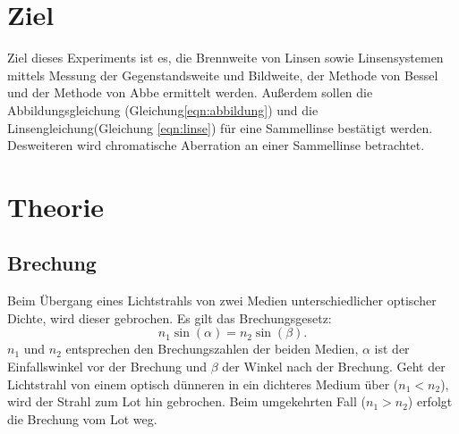 \section{Ziel}
\label{sec:Ziel}
Ziel dieses Experiments ist es, die Brennweite von Linsen sowie Linsensystemen mittels Messung der Gegenstandsweite und Bildweite, der Methode von Bessel und der Methode von Abbe ermittelt werden. Außerdem sollen die Abbildungsgleichung (Gleichung\ref{eqn:abbildung}) und die Linsengleichung(Gleichung \ref{eqn:linse})  für eine Sammellinse bestätigt werden. Desweiteren wird chromatische Aberration an einer Sammellinse betrachtet.


\section{Theorie}
\label{sec:theorie}
\subsection{Brechung}
Beim Übergang eines Lichtstrahls von zwei Medien unterschiedlicher optischer Dichte, wird dieser gebrochen. Es gilt das Brechungsgesetz:
\begin{equation}
n_1 \sin(\alpha)=n_2 \sin(\beta).
\end{equation}
$n_1$ und $n_2$ entsprechen den Brechungszahlen der beiden Medien, $\alpha$ ist der Einfallswinkel vor der Brechung und $\beta$ der Winkel nach der Brechung. Geht der Lichtstrahl von einem optisch dünneren in ein dichteres Medium über ($n_1 < n_2$), wird der Strahl zum Lot hin gebrochen. Beim umgekehrten Fall ($n_1 > n_2$) erfolgt die Brechung vom Lot weg.

